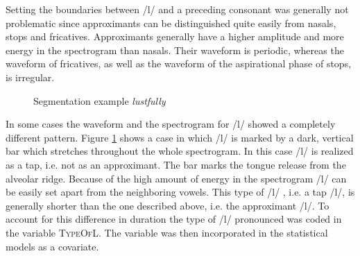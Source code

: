 Setting the boundaries between /l/ and a preceding consonant was generally not problematic since approximants can be distinguished quite easily from nasals, stops and fricatives. Approximants generally have a  higher amplitude and more energy in the spectrogram than nasals. Their waveform is periodic, whereas the waveform of fricatives, as well as the waveform of the aspirational phase of stops, is irregular.



\begin{figure} [t!]
	\centering
	\caption{Segmentation example \textit{lustfully}}
	\label{fig:segmentation lustfully}
\end{figure}


In some cases the waveform and the spectrogram for /l/ showed a completely different pattern. Figure \ref{fig:segmentation lustfully} shows a case in which /l/ is marked by a dark, vertical bar which stretches throughout the whole spectrogram. In this case /l/ is realized as a tap, i.e. not as an approximant. The bar marks the tongue release from the alveolar ridge. Because of the high amount of energy in the spectrogram /l/ can be easily set apart  from the neighboring vowels. This type of /l/ , i.e. a tap /l/, is generally shorter than the one described above, i.e. the approximant /l/. To account for this difference in duration the type of /l/ pronounced was coded in the variable \textsc{TypeOfL}. The variable was then incorporated in the statistical models as a covariate.\\




